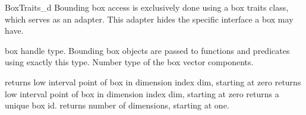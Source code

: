 
\ccRefPageBegin
\begin{ccRefConcept}{BoxTraits_d}
Bounding box access is exclusively done using a box traits class, which serves as an adapter. This adapter hides the specific interface a box may have.

\ccTypes
{} {box handle type. Bounding box objects are passed to functions and predicates using exactly this type.}
  {Number type of the box vector components.}

\ccOperations
{} {returns low interval point of box in dimension index dim, starting at zero}
 {returns low interval point of box in dimension index dim, starting at zero}
 {returns a unique box id. }
 {returns number of dimensions, starting at one.}

\ccHasModels
{}

\end{ccRefConcept}

\ccRefPageEnd

